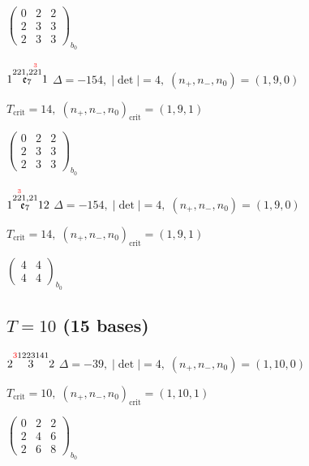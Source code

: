 \documentclass[10pt]{article}
\begin{document}
\hspace{2em}$\left(\begin{smallmatrix}0 & 2 & 2 \\ 2 & 3 & 3 \\ 2 & 3 & 3\end{smallmatrix}\right)_{\!b_0}$

\smallskip

$1\overset{221,2\overset{\textcolor{red}{3}}{2}1}{\mathfrak{e}_7}1$ \quad $\Delta=-154,\; |\det|=4,\; (n_+,n_-,n_0)=(1,9,0)$

\hspace{1em}$T_{\text{crit}}=14,\; (n_+,n_-,n_0)_{\text{crit}}=(1,9,1)$

\hspace{2em}$\left(\begin{smallmatrix}0 & 2 & 2 \\ 2 & 3 & 3 \\ 2 & 3 & 3\end{smallmatrix}\right)_{\!b_0}$

\smallskip

$1\overset{2\overset{\textcolor{red}{3}}{2}1,21}{\mathfrak{e}_7}12$ \quad $\Delta=-154,\; |\det|=4,\; (n_+,n_-,n_0)=(1,9,0)$

\hspace{1em}$T_{\text{crit}}=14,\; (n_+,n_-,n_0)_{\text{crit}}=(1,9,1)$

\hspace{2em}$\left(\begin{smallmatrix}4 & 4 \\ 4 & 4\end{smallmatrix}\right)_{\!b_0}$


\subsection*{$T = 10$ \quad (15 bases)}
\smallskip

$2\overset{\textcolor{red}{3}1223141}{3}2$ \quad $\Delta=-39,\; |\det|=4,\; (n_+,n_-,n_0)=(1,10,0)$

\hspace{1em}$T_{\text{crit}}=10,\; (n_+,n_-,n_0)_{\text{crit}}=(1,10,1)$

\hspace{2em}$\left(\begin{smallmatrix}0 & 2 & 2 \\ 2 & 4 & 6 \\ 2 & 6 & 8\end{smallmatrix}\right)_{\!b_0}$
\end{document}
